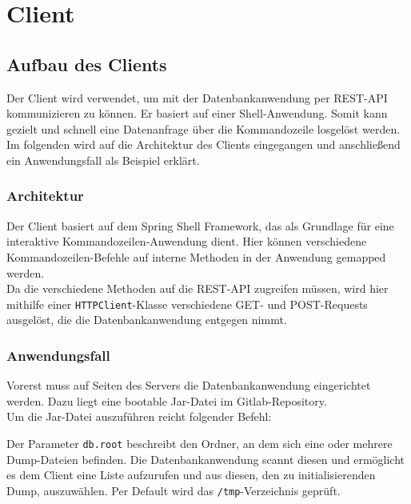 \chapter{Client}
\label{Client}


\section{Aufbau des Clients}

Der Client wird verwendet, um mit der Datenbankanwendung per REST-API kommunizieren zu können. Er basiert auf einer Shell-Anwendung. Somit kann gezielt und schnell eine Datenanfrage über die Kommandozeile losgelöst werden.
Im folgenden wird auf die Architektur des Clients eingegangen und anschließend ein Anwendungsfall als Beispiel erklärt.

\subsection{Architektur}

Der Client basiert auf dem Spring Shell Framework, das als Grundlage für eine interaktive Kommandozeilen-Anwendung dient. \cite{Spring:SpringShell}
Hier können verschiedene Kommandozeilen-Befehle auf interne Methoden in der Anwendung gemapped werden.\\

Da die verschiedene Methoden auf die REST-API zugreifen müssen, wird hier mithilfe einer \texttt{HTTPClient}-Klasse verschiedene GET- und POST-Requests ausgelöst, die die Datenbankanwendung entgegen nimmt.


\subsection{Anwendungsfall}

Vorerst muss auf Seiten des Servers die Datenbankanwendung eingerichtet werden. Dazu liegt eine bootable Jar-Datei im Gitlab-Repository. \cite{Gitlab:hhu}\\
Um die Jar-Datei auszuführen reicht folgender Befehl:

\begin{center}
\end{center}

Der Parameter \texttt{db.root} beschreibt den Ordner, an dem sich eine oder mehrere Dump-Dateien befinden. Die Datenbankanwendung scannt diesen und ermöglicht es dem Client eine Liste aufzurufen und aus diesen, den zu initialisierenden Dump, auszuwählen. Per Default wird das \texttt{/tmp}-Verzeichnis geprüft.

